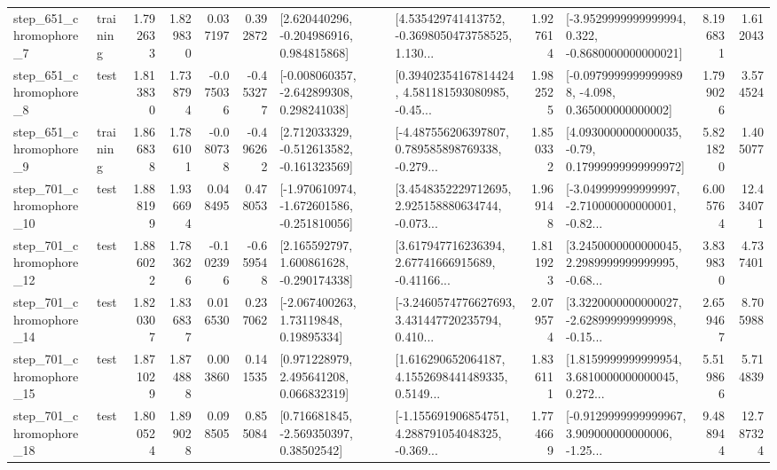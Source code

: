 \begin{tabular}{llrrrrllrlrr}
   step\_651\_chromophore\_7 &  training &      1.792633 &    1.829830 &      0.037197 &  0.392872 &    [2.620440296, -0.204986916, 0.984815868] &  [4.535429741413752, -0.3698050473758525, 1.130... &       1.927614 &  [-3.9529999999999994, 0.322, -0.8680000000000021] &            8.196831 &          1.612043 \\
   step\_651\_chromophore\_8 &      test &      1.813830 &    1.738794 &     -0.075036 & -0.453277 &   [-0.008060357, -2.642899308, 0.298241038] &  [0.39402354167814424, 4.581181593080985, -0.45... &       1.982525 &  [-0.09799999999999898, -4.098, 0.365000000000002] &            1.799026 &          3.574524 \\
   step\_651\_chromophore\_9 &  training &      1.866838 &    1.786101 &     -0.080738 & -0.496262 &   [2.712033329, -0.512613582, -0.161323569] &  [-4.487556206397807, 0.789585898769338, -0.279... &       1.850332 &   [4.0930000000000035, -0.79, 0.17999999999999972] &            5.821820 &          1.405077 \\
  step\_701\_chromophore\_10 &      test &      1.888199 &    1.936694 &      0.048495 &  0.478053 &  [-1.970610974, -1.672601586, -0.251810056] &  [3.4548352229712695, 2.925158880634744, -0.073... &       1.969148 &  [-3.049999999999997, -2.710000000000001, -0.82... &            6.005764 &         12.434071 \\
  step\_701\_chromophore\_12 &      test &      1.886022 &    1.783626 &     -0.102396 & -0.659548 &    [2.165592797, 1.600861628, -0.290174338] &  [3.617947716236394, 2.67741666915689, -0.41166... &       1.811923 &  [3.2450000000000045, 2.2989999999999995, -0.68... &            3.839830 &          4.737401 \\
  step\_701\_chromophore\_14 &      test &      1.820307 &    1.836837 &      0.016530 &  0.237062 &      [-2.067400263, 1.73119848, 0.19895334] &  [-3.2460574776627693, 3.431447720235794, 0.410... &       2.079574 &  [3.3220000000000027, -2.628999999999998, -0.15... &            2.659467 &          8.705988 \\
  step\_701\_chromophore\_15 &      test &      1.871029 &    1.874888 &      0.003860 &  0.141535 &     [0.971228979, 2.495641208, 0.066832319] &  [1.616290652064187, 4.1552698441489335, 0.5149... &       1.836111 &  [1.8159999999999954, 3.6810000000000045, 0.272... &            5.519866 &          5.714839 \\
  step\_701\_chromophore\_18 &      test &      1.800524 &    1.899028 &      0.098505 &  0.855084 &     [0.716681845, -2.569350397, 0.38502542] &  [-1.155691906854751, 4.288791054048325, -0.369... &       1.774669 &  [-0.9129999999999967, 3.909000000000006, -1.25... &            9.488944 &         12.787324 \\

\end{tabular}
